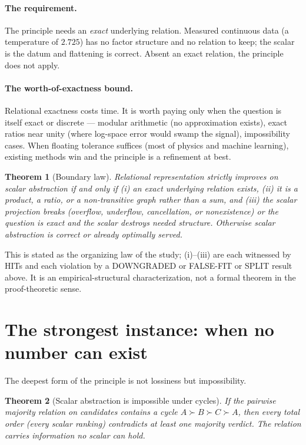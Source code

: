 \documentclass[11pt]{article}
\newtheorem{theorem}{Theorem}
\begin{document}
\paragraph{The requirement.} The principle needs an \emph{exact} underlying relation. Measured continuous
data (a temperature of $2.725$) has no factor structure and no relation to keep; the scalar is the datum and
flattening is correct. Absent an exact relation, the principle does not apply.

\paragraph{The worth-of-exactness bound.} Relational exactness costs time. It is worth paying only when the
question is itself exact or discrete --- modular arithmetic (no approximation exists), exact ratios near
unity (where log-space error would swamp the signal), impossibility cases. When floating tolerance suffices
(most of physics and machine learning), existing methods win and the principle is a refinement at best.

\begin{theorem}[Boundary law]
Relational representation strictly improves on scalar abstraction if and only if (i) an exact underlying
relation exists, (ii) it is a product, a ratio, or a non-transitive graph rather than a sum, and (iii) the
scalar projection breaks (overflow, underflow, cancellation, or nonexistence) or the question is exact and
the scalar destroys needed structure. Otherwise scalar abstraction is correct or already optimally served.
\end{theorem}

This is stated as the organizing law of the study; (i)--(iii) are each witnessed by HITs and each violation
by a DOWNGRADED or FALSE-FIT or SPLIT result above. It is an empirical-structural characterization, not a
formal theorem in the proof-theoretic sense.

\section{The strongest instance: when no number can exist}

The deepest form of the principle is not lossiness but impossibility.

\begin{theorem}[Scalar abstraction is impossible under cycles]
If the pairwise majority relation on candidates contains a cycle $A\!\succ\!B\!\succ\!C\!\succ\!A$, then every
total order (every scalar ranking) contradicts at least one majority verdict. The relation carries
information no scalar can hold.
\end{theorem}
\end{document}
